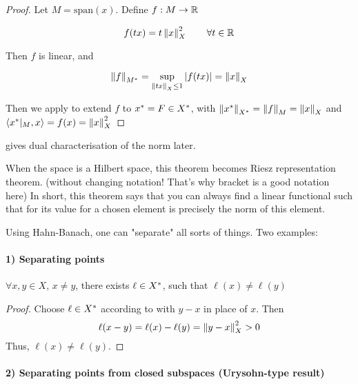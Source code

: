 \documentclass{article}
\begin{document}
\begin{proof}
	Let $M=\text{span}(x)$. Define $f: M \to \mathbb{R}$
	
	$$f(tx)=t\left\|{x}\right\|^2_X \qquad \forall t\in \mathbb{R}$$
	
	Then $f$ is linear, and 
	
	$$\left\|{f}\right\|_{{M}^*} = \sup_{\left\|{tx}\right\|_X \leq 1} |f(tx)| = \left\|{x}\right\|_X$$
	
	Then we apply  to extend $f$ to ${x}^*=F\in {X}^*$, with $\left\|{{x}^*}\right\|_{{X}^*}=\left\|{f}\right\|_M=\left\|{x}\right\|_X$ and $\left<{{x}^*|_{M}},{x}\right>=f(x)=\left\|{x}\right\|_X^2$
\end{proof}

\begin{remark}
     gives dual characterisation of the norm later.  
    \begin{unexaminable}
        When the space is a Hilbert space, this theorem becomes Riesz representation theorem. (without changing notation! That's why bracket is a good notation here) In short, this theorem says that you can always find a linear functional such that for its value for a chosen element is precisely the norm of this element.
    \end{unexaminable}
\end{remark}  

Using Hahn-Banach, one can "separate" all sorts of things. Two examples:  

\paragraph{1) Separating points}  

\begin{proposition}
$\forall x,y \in X$, $x\neq y$, there exists $\ell \in {X}^*$, such that $\ell(x) \neq \ell(y)$
\end{proposition}  

\begin{proof}
    Choose $\ell \in {X}^*$ according to  with $y-x$ in place of $x$.  
    Then  
    $$\ell (x-y) = \ell(x) - \ell(y) = \left\|{y-x}\right\|^2_X >0$$ 
    Thus, $\ell(x) \neq \ell(y)$.
\end{proof}

\paragraph{2) Separating points from closed subspaces (Urysohn-type result)}
\end{document}
